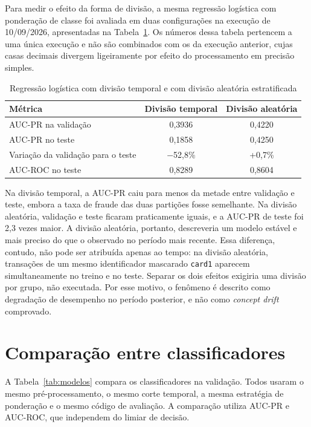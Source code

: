Para medir o efeito da forma de divisão, a mesma regressão logística com ponderação de classe foi avaliada em duas configurações na execução de 10/09/2026, apresentadas na Tabela~\ref{tab:divisao}. Os números dessa tabela pertencem a uma única execução e não são combinados com os da execução anterior, cujas casas decimais divergem ligeiramente por efeito do processamento em precisão simples.

\begin{table}[htb]
    \caption{Regressão logística com divisão temporal e com divisão aleatória estratificada}
    \label{tab:divisao}
    \centering
    \begin{tabular}{lcc}
        \hline
        Métrica & Divisão temporal & Divisão aleatória \\
        \hline
        AUC-PR na validação & 0,3936 & 0,4220 \\
        AUC-PR no teste & 0,1858 & 0,4250 \\
        Variação da validação para o teste & $-$52,8\% & +0,7\% \\
        AUC-ROC no teste & 0,8289 & 0,8604 \\
        \hline
    \end{tabular}
\end{table}

Na divisão temporal, a AUC-PR caiu para menos da metade entre validação e teste, embora a taxa de fraude das duas partições fosse semelhante. Na divisão aleatória, validação e teste ficaram praticamente iguais, e a AUC-PR de teste foi 2,3 vezes maior. A divisão aleatória, portanto, descreveria um modelo estável e mais preciso do que o observado no período mais recente. Essa diferença, contudo, não pode ser atribuída apenas ao tempo: na divisão aleatória, transações de um mesmo identificador mascarado \texttt{card1} aparecem simultaneamente no treino e no teste. Separar os dois efeitos exigiria uma divisão por grupo, não executada. Por esse motivo, o fenômeno é descrito como degradação de desempenho no período posterior, e não como \emph{concept drift} comprovado.

\section{Comparação entre classificadores}

A Tabela~\ref{tab:modelos} compara os classificadores na validação. Todos usaram o mesmo pré-processamento, o mesmo corte temporal, a mesma estratégia de ponderação e o mesmo código de avaliação. A comparação utiliza AUC-PR e AUC-ROC, que independem do limiar de decisão.

